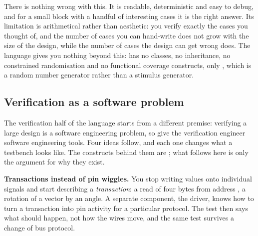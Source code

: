 
There is nothing wrong with this. It is readable, deterministic and easy to
debug, and for a small block with a handful of interesting cases it is the
right answer. Its limitation is arithmetical rather than aesthetic: you verify
exactly the cases you thought of, and the number of cases you can hand-write
does not grow with the size of the design, while the number of cases the design
can get wrong does. The language gives you nothing beyond this: \VHDL{} has no
classes, no inheritance, no constrained randomisation and no functional
coverage constructs, only , which is a random
number generator rather than a stimulus generator.

\subsection{Verification as a software problem}

The \SV{} verification
half of the language starts from a different premise: verifying a large design
is a software engineering problem, so give the verification engineer software
engineering tools. Four ideas follow, and each one changes what a testbench
looks like. The constructs behind them are ; what follows here
is only the argument for why they exist.

\textbf{Transactions instead of pin wiggles.} You stop writing values onto
individual signals and start describing a \emph{transaction}: a read of four
bytes from address , a rotation of a vector by an angle. A separate
component, the driver, knows how to turn a transaction into pin activity for a
particular protocol. The test then says what should happen, not how the wires
move, and the same test survives a change of bus protocol.

